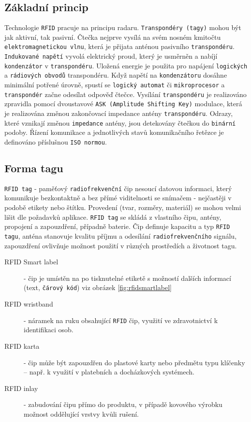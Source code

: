 \documentclass[czech,BP]{thesiskiv}
\begin{document}
\subsection{Základní princip}
Technologie \texttt{RFID} pracuje na principu radaru. \texttt{Transpondéry (tagy)} mohou být jak aktivní, tak pasivní. Čtečka nejprve vysílá na svém nosném kmitočtu \texttt{elektromagnetickou vlnu}, která je přijata anténou pasivního \texttt{transpondéru}. \texttt{Indukované napětí} vyvolá elektrický proud, který je usměrněn a nabíjí \texttt{kondenzátor} v \texttt{transpondéru}. Uložená energie je použita pro napájení \texttt{logických} a \texttt{rádiových obvodů} transpondéru. Když napětí na \texttt{kondenzátoru} dosáhne minimální potřené úrovně, spustí se \texttt{logický automat} či \texttt{mikroprocesor} a \texttt{transpondér} začne odesílat odpověď čtečce. Vysílání \texttt{transpondéru} je realizováno zpravidla pomocí dvoustavové \texttt{ASK (Amplitude Shifting Key)} modulace, která je realizována změnou zakončovací impedance antény \texttt{transpondéru}. Odrazy, které vznikají změnou \texttt{impedance} antény, jsou detekovány čtečkou do \texttt{binární} podoby. Řízení komunikace a jednotlivých stavů komunikačního řetězce je definováno příslušnou \texttt{ISO normou}.\cite{dolevcek2010identifikace}

\subsection{Forma tagu}
\texttt{RFID tag} - paměťový \texttt{radiofrekvenční} čip nesoucí datovou informaci, který komunikuje bezkontaktně a bez přímé viditelnosti se snímačem - nejčastěji v podobě etikety nebo štítku. Provedení (tvar, rozměry, materiál) se mohou velmi lišit dle požadavků aplikace. \texttt{RFID tag} se skládá z vlastního čipu, antény, propojení a zapouzdření, případně baterie. Čip definuje kapacitu a typ \texttt{RFID tagu}, anténa stanovuje kvalitu příjmu a odesílání \texttt{radiofrekvenčního} signálu, zapouzdření ovlivňuje možnost použití v různých prostředích a životnost tagu.\cite{dolevcek2010identifikace}

\newpage
\begin{description}
\item [RFID Smart label]
- čip je umístěn na po tisknutelné etiketě s možností dalších informací (text, \texttt{čárový kód}) viz obrázek \ref{fig:rfidsmartlabel}
\item [RFID wristband] - náramek na ruku obsahující \texttt{RFID} čip,  využití ve zdravotnictví k identifikaci osob.
\item [RFID karta] - čip může být zapouzdřen do plastové karty nebo předmětu typu klíčenky – např. k využití v platebních a docházkových systémech.
\item [RFID inlay] - zabudování čipu přímo do produktu, v případě kovového výrobku možnost oddělující vrstvy kvůli rušení.
\end{description}
\end{document}
